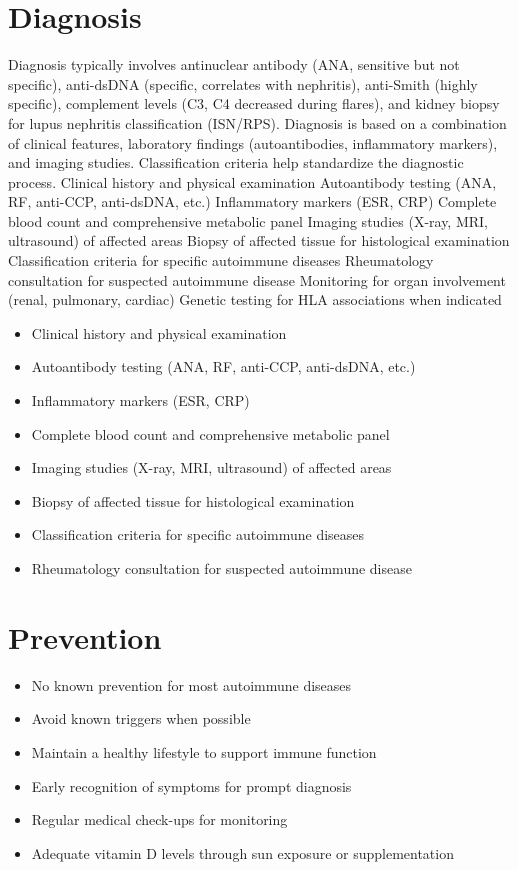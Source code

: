 \section{Diagnosis}
Diagnosis typically involves antinuclear antibody (ANA, sensitive but not specific), anti-dsDNA (specific, correlates with nephritis), anti-Smith (highly specific), complement levels (C3, C4 decreased during flares), and kidney biopsy for lupus nephritis classification (ISN/RPS). Diagnosis is based on a combination of clinical features, laboratory findings (autoantibodies, inflammatory markers), and imaging studies. Classification criteria help standardize the diagnostic process. Clinical history and physical examination Autoantibody testing (ANA, RF, anti-CCP, anti-dsDNA, etc.) Inflammatory markers (ESR, CRP) Complete blood count and comprehensive metabolic panel Imaging studies (X-ray, MRI, ultrasound) of affected areas Biopsy of affected tissue for histological examination Classification criteria for specific autoimmune diseases Rheumatology consultation for suspected autoimmune disease Monitoring for organ involvement (renal, pulmonary, cardiac) Genetic testing for HLA associations when indicated

\begin{itemize}[noitemsep]
  \item Clinical history and physical examination
  \item Autoantibody testing (ANA, RF, anti-CCP, anti-dsDNA, etc.)
  \item Inflammatory markers (ESR, CRP)
  \item Complete blood count and comprehensive metabolic panel
  \item Imaging studies (X-ray, MRI, ultrasound) of affected areas
  \item Biopsy of affected tissue for histological examination
  \item Classification criteria for specific autoimmune diseases
  \item Rheumatology consultation for suspected autoimmune disease
\end{itemize}
\section{Prevention}
\begin{itemize}[noitemsep]
  \item No known prevention for most autoimmune diseases
  \item Avoid known triggers when possible
  \item Maintain a healthy lifestyle to support immune function
  \item Early recognition of symptoms for prompt diagnosis
  \item Regular medical check-ups for monitoring
  \item Adequate vitamin D levels through sun exposure or supplementation
\end{itemize}
